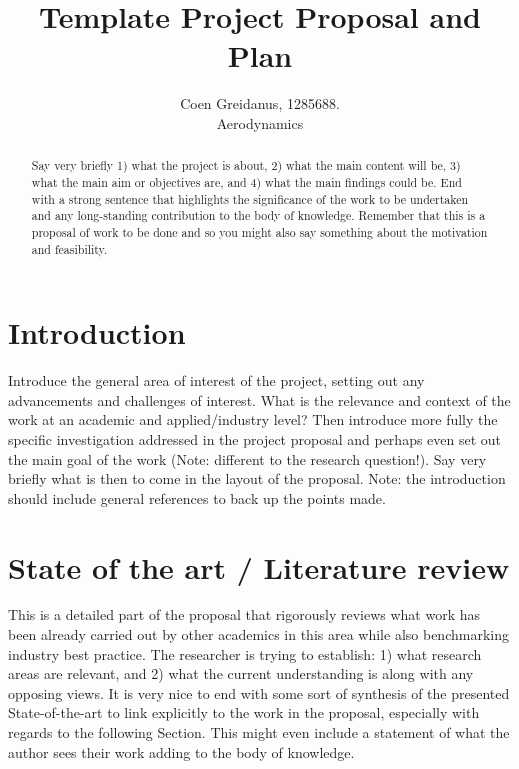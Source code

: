 \documentclass{article}
\title{Template Project Proposal and Plan}
\author{Coen Greidanus, 1285688.\\
Aerodynamics}
\begin{document}
\maketitle

\begin{abstract}

Say very briefly 1) what the project is about, 2) what the main content will be, 3) what the main aim or objectives are, and 4) what the main findings could be. End with a strong sentence that highlights the significance of the work to be undertaken and any long-standing contribution to the body of knowledge. Remember that this is a proposal of work to be done and so you might also say something about the motivation and feasibility.

\end{abstract}

\section{Introduction}
\label{sec:intro}

Introduce the general area of interest of the project, setting out any advancements and challenges of interest. What is the relevance and context of the work at an academic and applied/industry level? Then introduce more fully the specific investigation addressed in the project proposal and perhaps even set out the main goal of the work (Note: different to the research question!). Say very briefly what is then to come in the layout of the proposal. Note: the introduction should include general references to back up the points made.

\section{State of the art / Literature review}
\label{sec:litreview}

This is a detailed part of the proposal that rigorously reviews what work has been already carried out by other academics in this area while also benchmarking industry best practice. The researcher is trying to establish: 1) what research areas are relevant, and 2) what the current understanding is along with any opposing views. It is very nice to end with some sort of synthesis of the presented State-of-the-art to link explicitly to the work in the proposal, especially with regards to the following Section. This might even include a statement of what the author sees their work adding to the body of knowledge.
\end{document}

